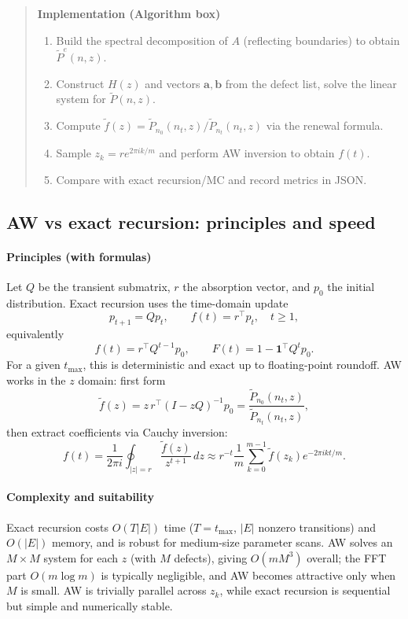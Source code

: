 \documentclass[11pt]{article}
\begin{document}
\begin{quote}
\textbf{Implementation (Algorithm box)}
\begin{enumerate}[leftmargin=*, itemsep=0pt]
  \item Build the spectral decomposition of $A$ (reflecting boundaries) to obtain $\tilde P^e(n,z)$.
  \item Construct $H(z)$ and vectors $\mathbf{a},\mathbf{b}$ from the defect list, solve the linear system for $\tilde P(n,z)$.
  \item Compute $\tilde f(z)=\tilde P_{n_0}(n_t,z)/\tilde P_{n_t}(n_t,z)$ via the renewal formula.
  \item Sample $z_k=r e^{2\pi i k/m}$ and perform AW inversion to obtain $f(t)$.
  \item Compare with exact recursion/MC and record metrics in JSON.
\end{enumerate}
\end{quote}

\subsection{AW vs exact recursion: principles and speed}
\paragraph{Principles (with formulas)}
Let $Q$ be the transient submatrix, $r$ the absorption vector, and $p_0$ the initial distribution. Exact recursion uses the time-domain update
\[
  p_{t+1}=Qp_t,\qquad f(t)=r^\top p_t,\quad t\ge 1,
\]
equivalently
\[
  f(t)=r^\top Q^{t-1}p_0,\qquad F(t)=1-\mathbf{1}^\top Q^t p_0.
\]
For a given $t_{\max}$, this is deterministic and exact up to floating-point roundoff. AW works in the $z$ domain: first form
\[
  \tilde f(z)=z\,r^\top (I-zQ)^{-1}p_0
  =\frac{\tilde P_{n_0}(n_t,z)}{\tilde P_{n_t}(n_t,z)},
\]
then extract coefficients via Cauchy inversion:
\[
  f(t)=\frac{1}{2\pi i}\oint_{|z|=r}\frac{\tilde f(z)}{z^{t+1}}\,dz
  \approx r^{-t}\frac{1}{m}\sum_{k=0}^{m-1}\tilde f(z_k)e^{-2\pi i k t/m}.
\]

\paragraph{Complexity and suitability}
Exact recursion costs $O(T|E|)$ time ($T=t_{\max}$, $|E|$ nonzero transitions) and $O(|E|)$ memory, and is robust for medium-size parameter scans. AW solves an $M\times M$ system for each $z$ (with $M$ defects), giving $O(m M^3)$ overall; the FFT part $O(m\log m)$ is typically negligible, and AW becomes attractive only when $M$ is small. AW is trivially parallel across $z_k$, while exact recursion is sequential but simple and numerically stable.
\end{document}
